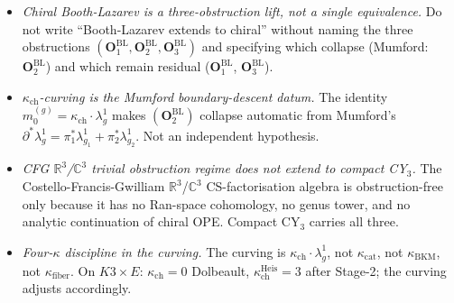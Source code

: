 \documentclass[11pt]{amsart}
\newcommand{\kch}{\kappa_{\mathrm{ch}}}
\newcommand{\kcat}{\kappa_{\mathrm{cat}}}
\newcommand{\kBKM}{\kappa_{\mathrm{BKM}}}
\newcommand{\kfib}{\kappa_{\mathrm{fiber}}}
\newcommand{\bC}{\mathbb{C}}
\newcommand{\bR}{\mathbb{R}}
\begin{document}
\begin{itemize}
\item[AP-CY\#.] \emph{Chiral Booth-Lazarev is a three-obstruction
lift, not a single equivalence.} Do not write ``Booth-Lazarev
extends to chiral'' without naming the three obstructions
$(\mathbf{O}_1^{\mathrm{BL}}, \mathbf{O}_2^{\mathrm{BL}},
\mathbf{O}_3^{\mathrm{BL}})$ and specifying which collapse
(Mumford: $\mathbf{O}_2^{\mathrm{BL}}$) and which remain
residual ($\mathbf{O}_1^{\mathrm{BL}}$, $\mathbf{O}_3^{\mathrm{BL}}$).
\item[AP-CY\#.] \emph{$\kch$-curving \emph{is} the Mumford
boundary-descent datum.} The identity $m_0^{(g)} = \kch
\cdot \lambda_g^1$ makes $(\mathbf{O}_2^{\mathrm{BL}})$ collapse
automatic from Mumford's $\partial^*\lambda_g^1 = \pi_1^*\lambda_{g_1}^1
+ \pi_2^*\lambda_{g_2}^1$. Not an independent hypothesis.
\item[AP-CY\#.] \emph{CFG $\bR^3$/$\bC^3$ trivial obstruction regime
does not extend to compact CY$_3$.} The Costello-Francis-Gwilliam
$\bR^3$/$\bC^3$ CS-factorisation algebra is obstruction-free only
because it has no Ran-space cohomology, no genus tower, and no
analytic continuation of chiral OPE. Compact CY$_3$ carries
all three.
\item[AP-CY\#.] \emph{Four-$\kappa$ discipline in the curving.}
The curving is $\kch \cdot \lambda_g^1$, not $\kcat$, not
$\kBKM$, not $\kfib$. On $K3 \times E$: $\kch = 0$ Dolbeault,
$\kch^{\mathrm{Heis}} = 3$ after Stage-2; the curving
adjusts accordingly.
\end{itemize}
\end{document}
